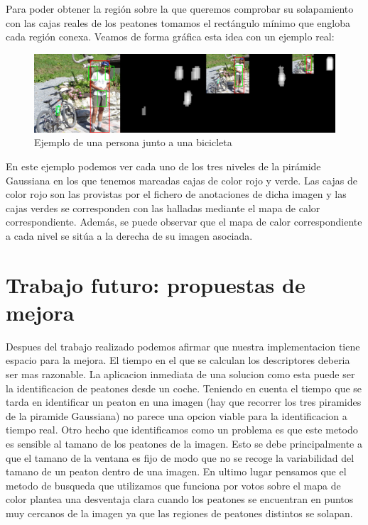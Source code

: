 \documentclass[a4paper,12pt]{article}
\begin{document}
Para poder obtener la región sobre la que queremos comprobar su solapamiento con las cajas reales de los peatones tomamos el rectángulo mínimo que engloba cada región conexa. Veamos de forma gráfica esta idea con un ejemplo real:

\begin{figure}
	\includegraphics[scale=0.16]{./Imagenes/test01.jpg}
	\caption{Ejemplo de una persona junto a una bicicleta}
\end{figure}

En este ejemplo podemos ver cada uno de los tres niveles de la pirámide Gaussiana en los que tenemos marcadas cajas de color rojo y verde. Las cajas de color rojo son las provistas por el fichero de anotaciones de dicha imagen y las cajas verdes se corresponden con las halladas mediante el mapa de calor correspondiente. Además, se puede observar que el mapa de calor correspondiente a cada nivel se sitúa a la derecha de su imagen asociada.






\section{Trabajo futuro: propuestas de mejora}

Despues del trabajo realizado podemos afirmar que nuestra implementacion tiene espacio para la mejora. El tiempo en el que se calculan los descriptores deberia ser mas razonable. La aplicacion inmediata de una solucion como esta puede ser la identificacion de peatones desde un coche. Teniendo en cuenta el tiempo que se tarda en identificar un peaton en una imagen (hay que recorrer los tres piramides de la piramide Gaussiana) no parece una opcion viable para la identificacion a tiempo real. Otro hecho que identificamos como un problema es que este metodo es sensible al tamano de los peatones de la imagen. Esto se debe principalmente a que el tamano de la ventana es fijo de modo que no se recoge la variabilidad del tamano de un peaton dentro de una imagen. En ultimo lugar pensamos que el metodo de busqueda que utilizamos que funciona por votos sobre el mapa de color plantea una desventaja clara cuando los peatones se encuentran en puntos muy cercanos de la imagen ya que las regiones de peatones distintos se solapan.

\normalsize


%
%
\end{document}
